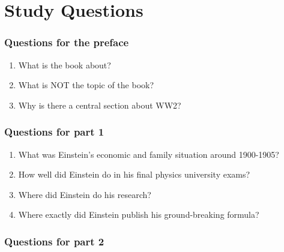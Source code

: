 %

\chapter{Study Questions}

\subsection*{Questions for the preface}
\begin{enumerate}  
\item What is the book about?  
\item What is NOT the topic of the book?
\item Why is there a central section about WW2?
\end{enumerate}

\subsection*{Questions for part 1}
\begin{enumerate}  
\item What was Einstein’s economic and family situation around 1900-1905? 
\item How well did Einstein do in his final physics university exams?
\item Where did Einstein do his research?
\item Where exactly did Einstein publish his ground-breaking formula?
\end{enumerate}

\subsection*{Questions for part 2}
